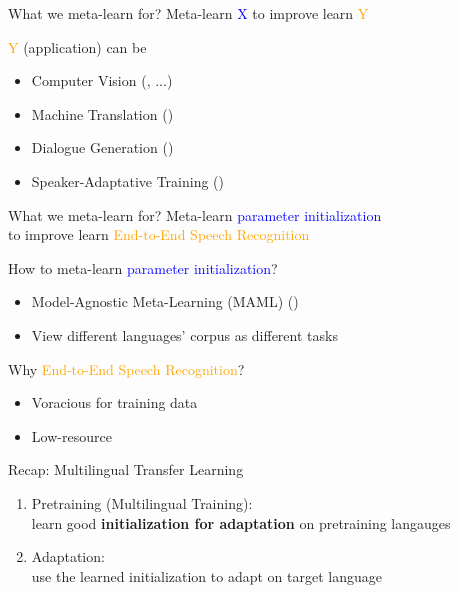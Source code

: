\documentclass{beamer}
\begin{document}
\begin{frame}[t]{What we meta-learn for?}
  \centering Meta-learn \textcolor{blue}{X} to improve learn \textcolor{orange}{Y}

  \flushleft \textcolor{orange}{Y} (application) can be
  \begin{itemize}
    \item Computer Vision (\citealt{snell2017prototypical}, \citealt{rusu2018meta} ...)
    \item Machine Translation (\citealt{gu2018meta})
    \item Dialogue Generation (\citealt{mi2019meta})
    \item Speaker-Adaptative Training (\citealt{klejch2019speaker})
  \end{itemize}
\end{frame}

\begin{frame}[t]{What we meta-learn for?}
  \centering Meta-learn \textcolor{blue}{parameter initialization} \\ to improve learn \textcolor{orange}{End-to-End Speech Recognition}

  \pause
  \flushleft How to meta-learn \textcolor{blue}{parameter initialization}?
  \begin{itemize}
    \item Model-Agnostic Meta-Learning (MAML) (\citealt{finn2017model})
    \item View different languages' corpus as different tasks
  \end{itemize}

  \pause

  Why \textcolor{orange}{End-to-End Speech Recognition}?
  \begin{itemize}
    \item Voracious for training data
    \item Low-resource 
  \end{itemize}
\end{frame}


\begin{frame}[t]{Recap: Multilingual Transfer Learning}

  \begin{enumerate}
    \item Pretraining (Multilingual Training): \\ learn good \textbf{initialization for adaptation} on pretraining langauges
    \item Adaptation: \\ use the learned initialization to adapt on target language
  \end{enumerate}
\end{frame}
\end{document}
